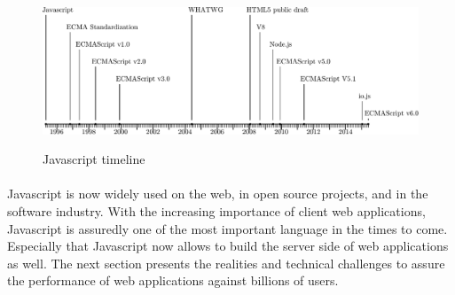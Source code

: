 \begin{figure}
  \centering
  \includegraphics[width=\linewidth]{../resources/javascript-timeline.pdf}
  \label{fig:js-timeline}
  \caption{Javascript timeline}
\end{figure}


\paragraph{}

Javascript is now widely used on the web, in open source projects, and in the software industry.
With the increasing importance of client web applications, Javascript is assuredly one of the most important language in the times to come.
Especially that Javascript now allows to build the server side of web applications as well.
The next section presents the realities and technical challenges to assure the performance of web applications against billions of users.




